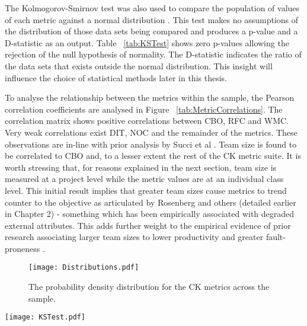 The Kolmogorov-Smirnov test was also used to compare the population of values of each metric against a normal distribution \citep{kolmogorov1933sulla, smirnov1948table}. This test makes no assumptions of the distribution of those data sets being compared and produces a p-value and a D-statistic as an output. Table ~\ref{tab:KSTest} shows zero p-values allowing the rejection of the null hypothesis of normality. The D-statistic indicates the ratio of the data sets that exists outside the normal distribution. This insight will influence the choice of statistical methods later in this thesis.

To analyse the relationship between the metrics within the sample, the Pearson correlation coefficients are analysed in Figure ~\ref{tab:MetricCorrelations}. The correlation matrix shows positive correlations between CBO, RFC and WMC. Very weak correlations exist DIT, NOC and the remainder of the metrics. These observations are in-line with prior analysis by Succi et al \citep{succi2005empirical}. Team size is found to be correlated to CBO and, to a lesser extent the rest of the CK metric suite. It is worth stressing that, for reasons explained in the next section, team size is measured at a project level while the metric values are at an individual class level. This initial result implies that greater team sizes cause metrics to trend counter to the objective as articulated by Rosenberg and others (detailed earlier in Chapter 2) - something which has been empirically associated with degraded external attributes. This adds further weight to the empirical evidence of prior research associating larger team sizes to lower productivity \citep{pendharkar2009relationship} and greater fault-proneness \citep{nagappan2008influence} \citep{caglayan2015merits}.

\begin{figure}[htbp!] 
\centering    
\texttt{[image: Distributions.pdf]}
\caption{The probability density distribution for the CK metrics across the sample.}
\label{fig:Distributions}
\end{figure}

\begin{table}
\centering 
{}
\begin{tabular}
 \centering 
 \texttt{[image: KSTest.pdf]}
 \label{tab:KSTest}
\end{tabular}
\end{table}


